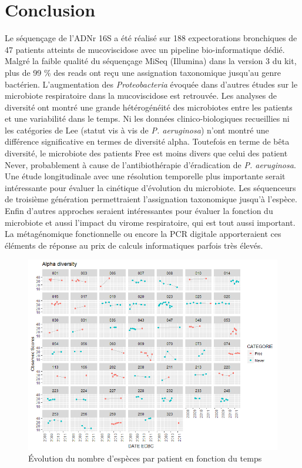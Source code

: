 \documentclass[12pt,a4paper]{article}
\begin{document}
{\section{Conclusion}
Le séquençage de l'ADNr 16S a été réalisé sur 188 expectorations bronchiques de 47 patients atteints de mucoviscidose avec un pipeline bio-informatique dédié. Malgré la faible qualité du séquençage MiSeq (Illumina) dans la version 3 du kit, plus de 99 \% des reads ont reçu une assignation taxonomique jusqu'au genre bactérien. L'augmentation des \textit{Proteobacteria} évoquée dans d'autres études sur le microbiote respiratoire dans la mucoviscidose est retrouvée. Les analyses de diversité ont montré une grande hétérogénéité des microbiotes entre les patients et une variabilité dans le temps. Ni les données clinico-biologiques recueillies ni les catégories de Lee (statut vis à vis de \textit{P. aeruginosa}) n'ont montré une différence significative en termes de diversité alpha. Toutefois en terme de bêta diversité, le microbiote des patients Free est moins divers que celui des patient Never, probablement à cause de l'antibiothérapie d'éradication de \textit{P. aeruginosa}. 
Une étude longitudinale avec une résolution temporelle plus importante serait intéressante pour évaluer la cinétique d'évolution du microbiote. Les séquenceurs de troisième génération permettraient l'assignation taxonomique jusqu'à l'espèce.
Enfin d'autres approches seraient intéressantes pour évaluer la fonction du microbiote et aussi l'impact du virome respiratoire, qui est tout aussi important. La métagénomique fonctionnelle ou encore la PCR digitale apporteraient ces éléments de réponse au prix de calculs informatiques parfois très élevés.


\begin{figure}[h]
\begin{center}
\includegraphics[scale=0.8]{img/alpha_observed.png}\hfill
\end{center}
\caption{Évolution du nombre d'espèces par patient en fonction du temps}
\label{alphaObs}
\end{figure}


}
\end{document}
